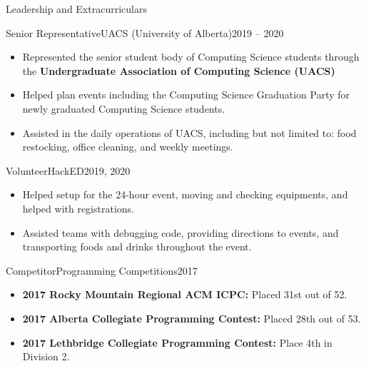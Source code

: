 \documentclass[]{mcdowellcv}
\begin{document}
\begin{cvsection}{Leadership and Extracurriculars}{}{}
  \begin{cvsubsection}{Senior Representative}{UACS (University of Alberta)}{2019 -- 2020}
    \vspace*{5pt}
    \begin{itemize}
      \item Represented the senior student body of Computing Science students through the \textbf{Undergraduate Association of Computing Science (UACS)}
      \item Helped plan events including the Computing Science Graduation Party for newly graduated Computing Science students.
      \item Assisted in the daily operations of UACS, including but not limited to: food restocking, office cleaning, and weekly meetings.        
    \end{itemize}
  \end{cvsubsection}

  \begin{cvsubsection}{Volunteer}{HackED}{2019, 2020}
    \begin{itemize}
      \item Helped setup for the 24-hour event, moving and checking equipments, and helped with registrations.
      \item Assisted teams with debugging code, providing directions to events, and transporting foods and drinks throughout the event.    
    \end{itemize}
  \end{cvsubsection}
  
  \begin{cvsubsection}{Competitor}{Programming Competitions}{2017}
    \begin{itemize}
      \item \textbf{2017 Rocky Mountain Regional ACM ICPC:} Placed 31st out of 52.
      \item \textbf{2017 Alberta Collegiate Programming Contest:} Placed 28th out of 53.
      \item \textbf{2017 Lethbridge Collegiate Programming Contest:} Place 4th in Division 2.
    \end{itemize}
  \end{cvsubsection}
\end{cvsection}
\end{document}
